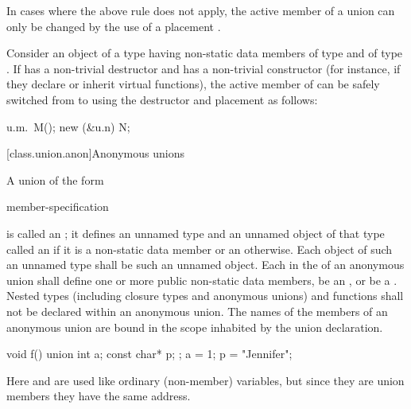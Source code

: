 \pnum
\begin{note}
In cases where the above rule does not apply,
the active member of a union can only be changed by
the use of a placement .
\end{note}
\begin{example}
Consider an object  of a  type  having non-static data members
 of type  and  of type . If  has a non-trivial
destructor and  has a non-trivial constructor (for instance, if they declare or inherit
virtual functions), the active member of  can be safely switched from  to
 using the destructor and placement  as follows:

\begin{codeblock}
u.m.~M();
new (&u.n) N;
\end{codeblock}
\end{example}

[class.union.anon]{Anonymous unions}
%

\pnum
{}%
%
A union of the form
\begin{ncsimplebnf}
 \terminal{\{} member-specification \terminal{\}} \terminal{;}
\end{ncsimplebnf}
is called an ; it defines an unnamed type and
an unnamed object of that type called
an 
if it is a non-static data member or
an  otherwise.
Each object of such an unnamed type shall be such an unnamed object.
%
%
Each  in the 
of an anonymous union shall define one or more public non-static data members,
be an , or
be a .
Nested types
(including closure types and anonymous unions)
and functions
shall not be declared within an anonymous union.
The names of the members of an anonymous union
are bound in the scope inhabited by the union declaration.
\begin{example}
\begin{codeblock}
void f() {
  union { int a; const char* p; };
  a = 1;
  p = "Jennifer";
}
\end{codeblock}

Here  and  are used like ordinary (non-member)
variables, but since they are union members they have the same address.
\end{example}

